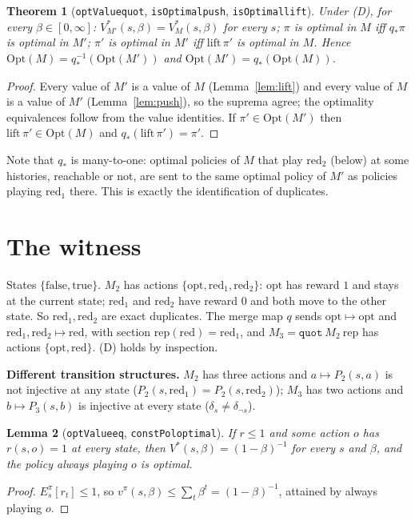 \documentclass[11pt]{article}
\newtheorem{theorem}{Theorem}
\newtheorem{lemma}[theorem]{Lemma}
\theoremstyle{definition}
\theoremstyle{remark}
\renewcommand{\_}{\oldus\allowbreak}
\begin{document}
\begin{theorem}[\texttt{optValue\_quot}, \texttt{isOptimal\_push}, \texttt{isOptimal\_lift}]
\label{thm:general}
Under (D), for every $\beta\in[0,\infty]$: $V^*_{M'}(s,\beta)=V^*_M(s,\beta)$ for every $s$;
$\pi$ is optimal in $M$ iff $q_*\pi$ is optimal in $M'$; $\pi'$ is optimal in $M'$ iff
$\mathrm{lift}\,\pi'$ is optimal in $M$. Hence $\mathrm{Opt}(M)=q_*^{-1}(\mathrm{Opt}(M'))$ and
$\mathrm{Opt}(M')=q_*(\mathrm{Opt}(M))$.
\end{theorem}
\begin{proof}
Every value of $M'$ is a value of $M$ (Lemma~\ref{lem:lift}) and every value of $M$ is a value of
$M'$ (Lemma~\ref{lem:push}), so the suprema agree; the optimality equivalences follow from the
value identities. If $\pi'\in\mathrm{Opt}(M')$ then $\mathrm{lift}\,\pi'\in\mathrm{Opt}(M)$ and
$q_*(\mathrm{lift}\,\pi')=\pi'$.
\end{proof}

Note that $q_*$ is many-to-one: optimal policies of $M$ that play $\mathrm{red}_2$ (below) at
some histories, reachable or not, are sent to the same optimal policy of $M'$ as policies playing
$\mathrm{red}_1$ there. This is exactly the identification of duplicates.

\section{The witness}

States $\{\mathrm{false},\mathrm{true}\}$. $M_2$ has actions $\{\mathrm{opt},\mathrm{red}_1,
\mathrm{red}_2\}$: $\mathrm{opt}$ has reward $1$ and stays at the current state;
$\mathrm{red}_1$ and $\mathrm{red}_2$ have reward $0$ and both move to the other state. So
$\mathrm{red}_1,\mathrm{red}_2$ are exact duplicates. The merge map $q$ sends $\mathrm{opt}\mapsto
\mathrm{opt}$ and $\mathrm{red}_1,\mathrm{red}_2\mapsto\mathrm{red}$, with section
$\mathrm{rep}(\mathrm{red})=\mathrm{red}_1$, and $M_3=\texttt{quot}\ M_2\ \mathrm{rep}$ has actions
$\{\mathrm{opt},\mathrm{red}\}$. (D) holds by inspection.

\textbf{Different transition structures.} $M_2$ has three actions and $a\mapsto P_2(s,a)$ is not
injective at any state ($P_2(s,\mathrm{red}_1)=P_2(s,\mathrm{red}_2)$); $M_3$ has two actions and
$b\mapsto P_3(s,b)$ is injective at every state ($\delta_s\neq\delta_{\neg s}$).

\begin{lemma}[\texttt{optValue\_eq}, \texttt{constPol\_optimal}]
If $r\le1$ and some action $o$ has $r(s,o)=1$ at every state, then $V^*(s,\beta)=(1-\beta)^{-1}$
for every $s$ and $\beta$, and the policy always playing $o$ is optimal.
\end{lemma}
\begin{proof}
$E^\pi_s[r_t]\le1$, so $v^\pi(s,\beta)\le\sum_t\beta^t=(1-\beta)^{-1}$, attained by always
playing $o$.
\end{proof}
\end{document}
